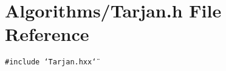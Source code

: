 \section{Algorithms/Tarjan.h File Reference}
\label{Tarjan_8h}
{\tt \#include \char`\"{}Tarjan.hxx\char`\"{}}\par
